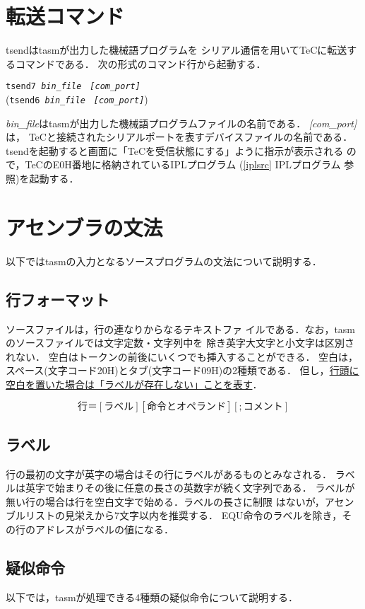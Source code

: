 \section{転送コマンド}
tsendはtasmが出力した機械語プログラムを
シリアル通信を用いてTeCに転送するコマンドである．
次の形式のコマンド行から起動する．

\begin{center}
{\tt tsend7  {\it bin\_file}　{\it [com\_port]}} \\
({\tt tsend6  {\it bin\_file}　{\it [com\_port]}})
\end{center}
{\it bin\_file}はtasmが出力した機械語プログラムファイルの名前である．
{\it [com\_port]}は，
TeCと接続されたシリアルポートを表すデバイスファイルの名前である．
tsendを起動すると画面に「TeCを受信状態にする」ように指示が表示される
ので，TeCのE0H番地に格納されているIPLプログラム
(\ref{iplsrc} IPLプログラム 参照)を起動する．
\vspace{0.2cm}

\section{アセンブラの文法}
\label{syn}
以下ではtasmの入力となるソースプログラムの文法について説明する．

\subsection{行フォーマット}
ソースファイルは，行の連なりからなるテキストファ
イルである．なお，tasmのソースファイルでは文字定数・文字列中を
除き英字大文字と小文字は区別されない．
空白はトークンの前後にいくつでも挿入することができる．
空白は，スペース(文字コード20H)とタブ(文字コード09H)の2種類である．
但し，\underline{行頭に空白を置いた場合は「ラベルが存在しない」ことを表す}．

\[ 行 ＝ [ラベル] [命令とオペランド] [;コメント] \]

\subsection{ラベル}
行の最初の文字が英字の場合はその行にラベルがあるものとみなされる．
ラベルは英字で始まりその後に任意の長さの英数字が続く文字列である．
ラベルが無い行の場合は行を空白文字で始める．ラベルの長さに制限
はないが，アセンブルリストの見栄えから7文字以内を推奨する．
EQU命令のラベルを除き，その行のアドレスがラベルの値になる．

\subsection{疑似命令}
以下では，tasmが処理できる4種類の疑似命令について説明する．

